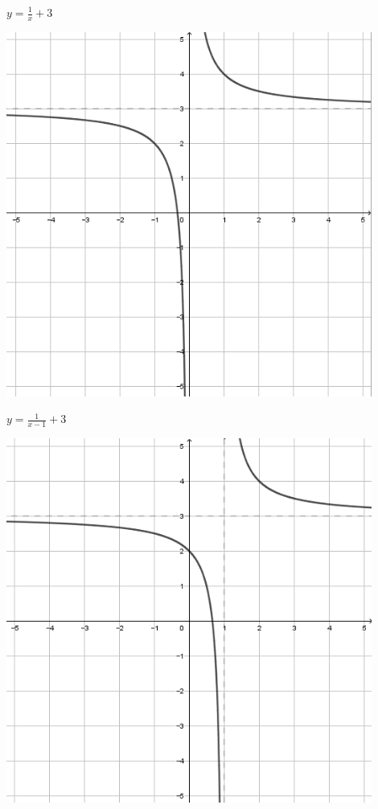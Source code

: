 \documentclass[a4paper]{oblivoir}
\begin{document}
\begin{minipage}{0.45\textwidth}\centering
\(y=\frac1x+3\)
\par\bigskip\includegraphics[width=0.9\textwidth]{img/4_rational_12}
\end{minipage}
\begin{minipage}{0.45\textwidth}\centering
\(y=\frac1{x-1}+3\)
\par\bigskip\includegraphics[width=0.9\textwidth]{img/4_rational_13}
\end{minipage}\bigskip\bigskip\par
\end{document}
